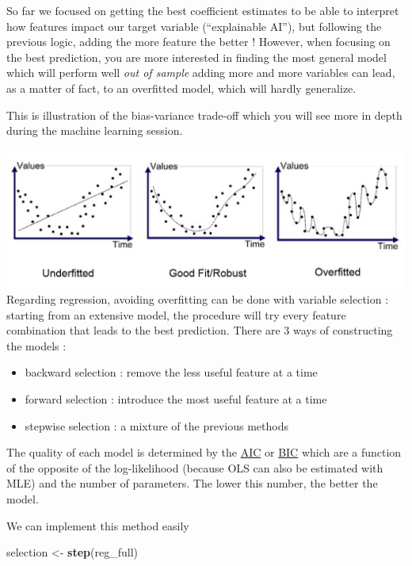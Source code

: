 \documentclass[
]{book}
\newenvironment{Shaded}{\begin{snugshade}}{\end{snugshade}}
\newcommand{\KeywordTok}[1]{\textcolor[rgb]{0.13,0.29,0.53}{\textbf{#1}}}
\newcommand{\NormalTok}[1]{#1}
\newcommand{\StringTok}[1]{\textcolor[rgb]{0.31,0.60,0.02}{#1}}
\providecommand{\tightlist}{%
  \setlength{\itemsep}{0pt}\setlength{\parskip}{0pt}}
\begin{document}
So far we focused on getting the best coefficient estimates to be able to interpret how features impact our target variable (``explainable AI''), but following the previous logic, adding the more feature the better ! However, when focusing on the best prediction, you are more interested in finding the most general model which will perform well \emph{out of sample} adding more and more variables can lead, as a matter of fact, to an overfitted model, which will hardly generalize.

This is illustration of the bias-variance trade-off which you will see more in depth during the machine learning session.

\includegraphics{img/Overfitting.png}
Regarding regression, avoiding overfitting can be done with variable selection : starting from an extensive model, the procedure will try every feature combination that leads to the best prediction. There are 3 ways of constructing the models :

\begin{itemize}
\tightlist
\item
  backward selection : remove the less useful feature at a time
\item
  forward selection : introduce the most useful feature at a time
\item
  stepwise selection : a mixture of the previous methods
\end{itemize}

The quality of each model is determined by the \href{https://en.wikipedia.org/wiki/Akaike_information_criterion}{AIC} or \href{https://en.wikipedia.org/wiki/Bayesian_information_criterion}{BIC} which are a function of the opposite of the log-likelihood (because OLS can also be estimated with MLE) and the number of parameters. The lower this number, the better the model.

We can implement this method easily

\begin{Shaded}
\begin{Highlighting}[]
\NormalTok{selection <-}\StringTok{ }\KeywordTok{step}\NormalTok{(reg_full)}
\end{Highlighting}
\end{Shaded}
\end{document}
